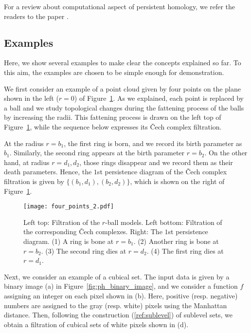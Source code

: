 \documentclass[smallextended]{svjour3}
\begin{document}
For a review about computational aspect of persistent homology, we refer the readers to the paper \citep{review}.





\subsection{Examples}
Here, we show several examples to make clear the concepts explained so far.  To this aim, the examples are chosen to be simple enough for demonstration.

We first consider an example of a point cloud given by four points on the plane shown in the left ($r=0$) of Figure~\ref{fig:four_points}. As we explained, each point is replaced by a ball and we study topological changes during the fattening process of the balls by increasing the radii. This fattening process is drawn on the left top of Figure~\ref{fig:four_points}, while the sequence below expresses its {\v C}ech complex filtration. 

At the radius $r=b_1$, the first ring is born, and we record its birth parameter as $b_1$. Similarly, the second ring appears at the birth parameter  $r=b_2$. On the other hand, at radius $r=d_1,d_2$, those rings disappear and we record them as their death parameters. Hence, the $1$st persistence diagram of the {\v C}ech complex filtration is given by $\{(b_1, d_1), (b_2, d_2)\}$, which is shown on the right of Figure~\ref{fig:four_points}. 

\begin{figure}[htbp]
  \centering
  \texttt{[image: four\_points\_2.pdf]}
  \caption{Left top: Filtration of the $r$-ball models. Left bottom: Filtration of the corresponding {\v C}ech complexes. Right: The $1$st persistence diagram.
  (1) A ring is bone at $r=b_1$. 
  (2) Another ring is bone at $r=b_2$. 
  (3) The second ring dies at $r=d_2$.  
  (4) The first ring dies at $r=d_1$.
  }
  \label{fig:four_points}
\end{figure}


Next, we consider an example of a cubical set. The input data is given by a binary image (a) in Figure~\ref{fig:ph_binary_image}, and we consider a function $f$ assigning an integer on each pixel shown in (b). 
Here, positive (resp. negative) numbers are assigned to the gray (resp. white) pixels using the Manhattan distance. Then, following the construction (\ref{ref:sublevel}) of sublevel sets, we obtain a filtration of cubical sets of white pixels shown in (d). 
\end{document}
